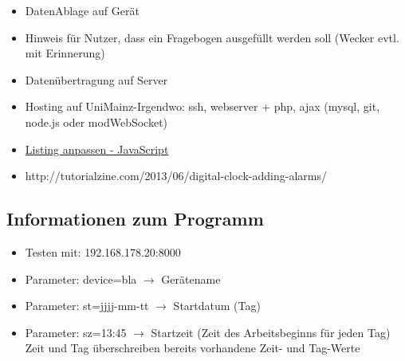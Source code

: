 \documentclass[a4paper]{scrartcl}
\begin{document}
\begin{itemize}
				\item DatenAblage auf Gerät
				\item Hinweis für Nutzer, dass ein Fragebogen ausgefüllt werden soll (Wecker evtl. mit Erinnerung)
				\item Datenübertragung auf Server
				\item Hosting auf UniMainz-Irgendwo: ssh, webserver + php, ajax (mysql, git, node.js oder modWebSocket)
				\item \href{http://mirror.math.ku.edu/tex-archive/macros/latex/contrib/listings/listings.pdf}{Listing anpassen - JavaScript} 
				\item http://tutorialzine.com/2013/06/digital-clock-adding-alarms/ 
			\end{itemize}

		\subsection{Informationen zum Programm}
			\begin{itemize}
				\item Testen mit: 192.168.178.20:8000
				\item Parameter: device=bla $\rightarrow$ Gerätename
				\item Parameter: st=jjjj-mm-tt $\rightarrow$ Startdatum (Tag)
				\item Parameter: sz=13:45 $\rightarrow$ Startzeit (Zeit des Arbeitsbeginns für jeden Tag)\newline
					Zeit und Tag überschreiben bereits vorhandene Zeit- und Tag-Werte
			\end{itemize}
\end{document}
